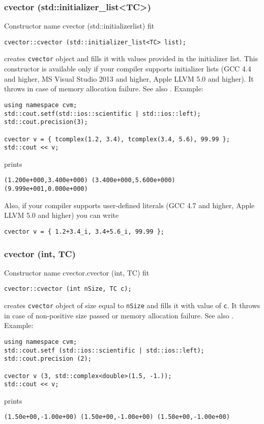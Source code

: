 \subsubsection{cvector (std::initializer\_list<TC>)}
Constructor%
\pdfdest name {cvector (std::initializerlist)} fit
\begin{verbatim}
cvector::cvector (std::initializer_list<TC> list);
\end{verbatim}
creates \verb"cvector" object and fills it with values provided in the initializer list.
This constructor is available only if your compiler supports initializer lists
(GCC 4.4 and higher, MS Visual Studio 2013 and higher, Apple LLVM 5.0 and higher).
It throws  
in case of memory allocation failure.
See also .
Example:
\begin{Verbatim}
using namespace cvm;
std::cout.setf(std::ios::scientific | std::ios::left);
std::cout.precision(3);

cvector v = { tcomplex(1.2, 3.4), tcomplex(3.4, 5.6), 99.99 };
std::cout << v;
\end{Verbatim}
prints
\begin{Verbatim}
(1.200e+000,3.400e+000) (3.400e+000,5.600e+000) (9.999e+001,0.000e+000)
\end{Verbatim}
Also, if your compiler supports user-defined literals (GCC 4.7 and higher, Apple LLVM 5.0 and higher)
you can write
\begin{Verbatim}
cvector v = { 1.2+3.4_i, 3.4+5.6_i, 99.99 };
\end{Verbatim}
\newpage




\subsubsection{cvector (int, TC)}
Constructor%
\pdfdest name {cvector.cvector (int, TC)} fit
\begin{verbatim}
cvector::cvector (int nSize, TC c);
\end{verbatim}
creates  \verb"cvector" object of size equal to \verb"nSize"
and fills it with value of \verb"c".
It throws  
in case of non-positive size passed or memory allocation failure.
See also .
Example:
\begin{Verbatim}
using namespace cvm;
std::cout.setf (std::ios::scientific | std::ios::left);
std::cout.precision (2);

cvector v (3, std::complex<double>(1.5, -1.));
std::cout << v;
\end{Verbatim}
prints
\begin{Verbatim}
(1.50e+00,-1.00e+00) (1.50e+00,-1.00e+00) (1.50e+00,-1.00e+00)
\end{Verbatim}
\newpage




